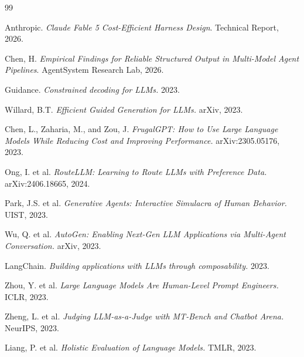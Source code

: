 \documentclass[11pt,a4paper]{article}
\begin{document}
\begin{thebibliography}{99}

Anthropic. \textit{Claude Fable 5 Cost-Efficient Harness Design}. Technical Report, 2026.

Chen, H. \textit{Empirical Findings for Reliable Structured Output in Multi-Model Agent Pipelines}. AgentSystem Research Lab, 2026.

Guidance. \textit{Constrained decoding for LLMs.} 2023.

Willard, B.T. \textit{Efficient Guided Generation for LLMs.} arXiv, 2023.

Chen, L., Zaharia, M., and Zou, J. \textit{FrugalGPT: How to Use Large Language Models While Reducing Cost and Improving Performance.} arXiv:2305.05176, 2023.

Ong, I. et al. \textit{RouteLLM: Learning to Route LLMs with Preference Data.} arXiv:2406.18665, 2024.

Park, J.S. et al. \textit{Generative Agents: Interactive Simulacra of Human Behavior.} UIST, 2023.

Wu, Q. et al. \textit{AutoGen: Enabling Next-Gen LLM Applications via Multi-Agent Conversation.} arXiv, 2023.

LangChain. \textit{Building applications with LLMs through composability.} 2023.

Zhou, Y. et al. \textit{Large Language Models Are Human-Level Prompt Engineers.} ICLR, 2023.

Zheng, L. et al. \textit{Judging LLM-as-a-Judge with MT-Bench and Chatbot Arena.} NeurIPS, 2023.

Liang, P. et al. \textit{Holistic Evaluation of Language Models.} TMLR, 2023.

\end{thebibliography}
\end{document}
